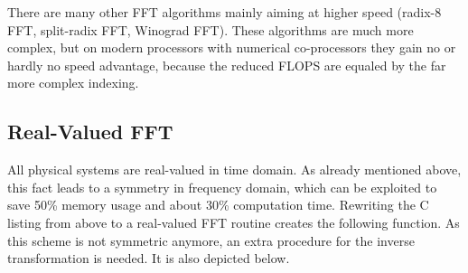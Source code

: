 \addvspace{12pt}

There are many other FFT algorithms mainly aiming at higher speed
(radix-8 FFT, split-radix FFT, Winograd FFT). These algorithms are
much more complex, but on modern processors with numerical co-processors
they gain no or hardly no speed advantage, because the reduced FLOPS
are equaled by the far more complex indexing.


\subsection{Real-Valued FFT}

All physical systems are real-valued in time domain. As already
mentioned above, this fact leads to a symmetry in frequency
domain, which can be exploited to save 50\% memory usage and
about 30\% computation time. Rewriting the C listing from above
to a real-valued FFT routine creates the following function.
As this scheme is not symmetric anymore, an extra procedure
for the inverse transformation is needed. It is also depicted
below.

